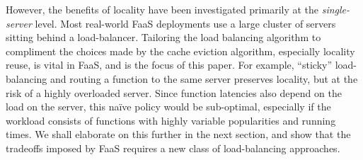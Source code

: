 However, the benefits of locality have been investigated primarily at the \emph{single-server} level.
Most real-world FaaS deployments use a large cluster of servers sitting behind a load-balancer.
Tailoring the load balancing algorithm to compliment the choices made by the cache eviction algorithm, especially locality reuse, is vital in FaaS, and is the focus of this paper.
For example, ``sticky'' load-balancing and routing a function to the same server preserves locality, but at the risk of a highly overloaded server.
Since function latencies also depend on the load on the server, this na\"ive policy would be sub-optimal, especially if the workload consists of functions with highly variable popularities and running times.
We shall elaborate on this further in the next section, and show that the tradeoffs imposed by FaaS requires a new class of load-balancing approaches. 









